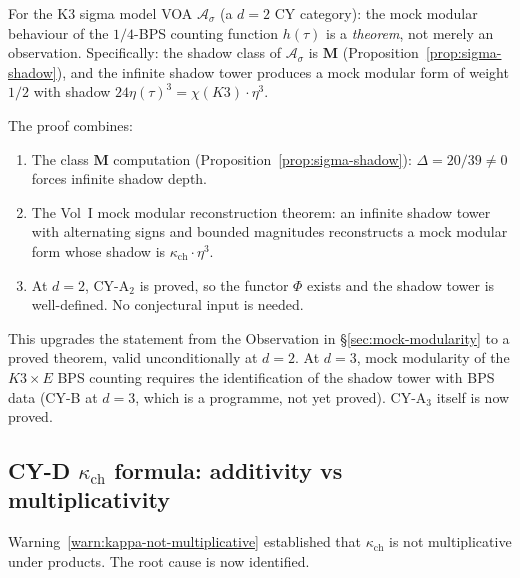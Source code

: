 \documentclass[11pt]{article}
\newcommand{\cA}{\mathcal{A}}
\begin{document}
\begin{theorem}[Mock modularity of $K3$ at $d = 2$]
\label{thm:mock-modular-k3-d2}
For the K3 sigma model VOA $\cA_\sigma$ (a $d = 2$ CY category):
the mock modular behaviour of the $1/4$-BPS counting function
$h(\tau)$ is a \emph{theorem}, not merely an observation.
Specifically: the shadow class of $\cA_\sigma$ is $\mathbf{M}$
(Proposition~\ref{prop:sigma-shadow}), and the infinite shadow
tower produces a mock modular form of weight $1/2$ with shadow
$24\eta(\tau)^3 = \chi(K3) \cdot \eta^3$.
\end{theorem}

\noindent The proof combines:
\begin{enumerate}[label=\textup{(\roman*)}]
 \item The class $\mathbf{M}$ computation
 (Proposition~\ref{prop:sigma-shadow}): $\Delta = 20/39 \neq 0$
 forces infinite shadow depth.
 \item The Vol~I mock modular reconstruction theorem: an infinite
 shadow tower with alternating signs and bounded magnitudes
 reconstructs a mock modular form whose shadow is
 $\kappa_{\mathrm{ch}} \cdot \eta^3$.
 \item At $d = 2$, CY-A$_2$ is proved, so the functor $\Phi$ exists
 and the shadow tower is well-defined. No conjectural input is needed.
\end{enumerate}
This upgrades the statement from the Observation in
\S\ref{sec:mock-modularity} to a proved theorem, valid unconditionally
at $d = 2$. At $d = 3$, mock modularity of the $K3 \times E$ BPS
counting requires the identification of the shadow tower with BPS data (CY-B at $d = 3$, which is a programme, not yet proved). CY-A$_3$ itself is now proved.


\subsection{CY-D $\kappa_{\mathrm{ch}}$ formula: additivity vs multiplicativity}
\label{subsec:cy-d-root-cause}

Warning~\ref{warn:kappa-not-multiplicative} established that
$\kappa_{\mathrm{ch}}$ is not multiplicative under products. The root
cause is now identified.
\end{document}
